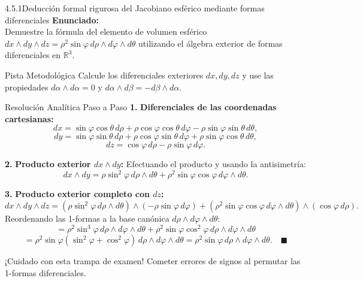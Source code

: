\documentclass[11pt,a4paper]{article}
\begin{document}
\begin{nivelbox}{4.5.1}{Deducción formal rigurosa del Jacobiano esférico mediante formas diferenciales}
\textbf{Enunciado:}\\
Demuestre la fórmula del elemento de volumen esférico $dx \wedge dy \wedge dz = \rho^2 \sin\varphi \, d\rho \wedge d\varphi \wedge d\theta$ utilizando el álgebra exterior de formas diferenciales en $\mathbb{R}^3$.

\begin{observacionbox}{Pista Metodológica}
Calcule los diferenciales exteriores $dx, dy, dz$ y use las propiedades $d\alpha \wedge d\alpha = 0$ y $d\alpha \wedge d\beta = -d\beta \wedge d\alpha$.
\end{observacionbox}

\begin{ejerciciobox}{Resolución Analítica Paso a Paso}
\smallskip\noindent\textbf{1.} \textbf{Diferenciales de las coordenadas cartesianas:}
\[dx = \sin\varphi\cos\theta \, d\rho + \rho\cos\varphi\cos\theta \, d\varphi - \rho\sin\varphi\sin\theta \, d\theta,\]
\[dy = \sin\varphi\sin\theta \, d\rho + \rho\cos\varphi\sin\theta \, d\varphi + \rho\sin\varphi\cos\theta \, d\theta,\]
\[dz = \cos\varphi \, d\rho - \rho\sin\varphi \, d\varphi.\]

\smallskip\noindent\textbf{2.} \textbf{Producto exterior $dx \wedge dy$:}
Efectuando el producto y usando la antisimetría:
\[dx \wedge dy = \rho\sin^2\varphi \, d\rho \wedge d\theta + \rho^2 \sin\varphi\cos\varphi \, d\varphi \wedge d\theta.\]

\smallskip\noindent\textbf{3.} \textbf{Producto exterior completo con $dz$:}
\[dx \wedge dy \wedge dz = (\rho\sin^2\varphi \, d\rho \wedge d\theta) \wedge (-\rho\sin\varphi \, d\varphi) + (\rho^2 \sin\varphi\cos\varphi \, d\varphi \wedge d\theta) \wedge (\cos\varphi \, d\rho).\]
Reordenando las 1-formas a la base canónica $d\rho \wedge d\varphi \wedge d\theta$:
\[= \rho^2 \sin^3\varphi \, d\rho \wedge d\varphi \wedge d\theta + \rho^2 \sin\varphi\cos^2\varphi \, d\rho \wedge d\varphi \wedge d\theta\]
\[= \rho^2 \sin\varphi (\sin^2\varphi + \cos^2\varphi) \, d\rho \wedge d\varphi \wedge d\theta = \rho^2 \sin\varphi \, d\rho \wedge d\varphi \wedge d\theta. \quad \blacksquare\]
\end{ejerciciobox}

\begin{errorbox}{¡Cuidado con esta trampa de examen!}
Cometer errores de signos al permutar las 1-formas diferenciales.
\end{errorbox}
\end{nivelbox}
\bigskip
\end{document}
